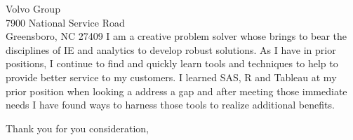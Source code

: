 \documentclass[version=last,12pt,{"C:/Program Files/R/R-3.6.1/library/komaletter/rmarkdown/templates/pdf/resources/maintainersDelight"},]{scrlttr2}
\begin{document}
\begin{letter}{Volvo Group\\7900 National Service Road\\Greensboro, NC 27409}
I am a creative problem solver whose brings to bear the disciplines of
IE and analytics to develop robust solutions. As I have in prior
positions, I continue to find and quickly learn tools and techniques to
help to provide better service to my customers. I learned SAS, R and
Tableau at my prior position when looking a address a gap and after
meeting those immediate needs I have found ways to harness those tools
to realize additional benefits.

\closing{Thank you for you consideration,}




\end{letter}
\end{document}
